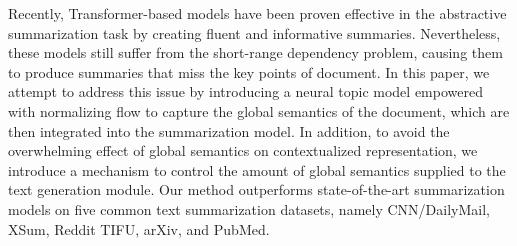 Recently, Transformer-based models have been proven effective in the abstractive summarization task by creating fluent and informative summaries. Nevertheless, these models still suffer from the short-range dependency problem, causing them to produce summaries that miss the key points of document. In this paper, we attempt to address this issue by introducing a neural topic model empowered with normalizing flow to capture the global semantics of the document, which are then integrated into the summarization model. In addition, to avoid the overwhelming effect of global semantics on contextualized representation, we introduce a mechanism to control the amount of global semantics supplied to the text generation module. Our method outperforms state-of-the-art summarization models on five common text summarization datasets, namely CNN/DailyMail, XSum, Reddit TIFU, arXiv, and PubMed.
